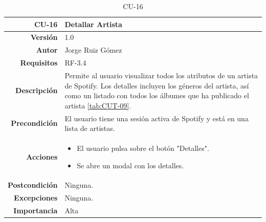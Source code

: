 \begin{table}[H]
    \centering
    \begin{tabular}{r|p{}}
    \hline
    \textbf{CU-16}  & \textbf{Detallar Artista}                                 \\ \hline
    \textbf{Versión}       & 1.0                                                     \\
    \textbf{Autor}         & Jorge Ruiz Gómez                                        \\
    \textbf{Requisitos}    & RF-3.4                                        \\
    \textbf{Descripción}   & Permite al usuario visualizar todos los atributos de un artista de Spotify. Los detalles incluyen los géneros del artista, así como un listado con todos los álbumes que ha publicado el artista \ref{tab:CUT-09}. 
    \\ \hline
    \textbf{Precondición}  & El usuario tiene una sesión activa de Spotify y está en una lista de artistas.\\
    \textbf{Acciones}      &    \begin{itemize}
                                    \item El usuario pulsa sobre el botón "Detalles".
                                    \item Se abre un modal con los detalles.
                                \end{itemize}\\
                                                                              
    \textbf{Postcondición} & Ninguna. \\
    \textbf{Excepciones}   & Ninguna.    \\
    \textbf{Importancia}   & Alta        \\ \hline
    \end{tabular}
    \caption{CU-16}
    \label{tab:CUT-16}
\end{table}
